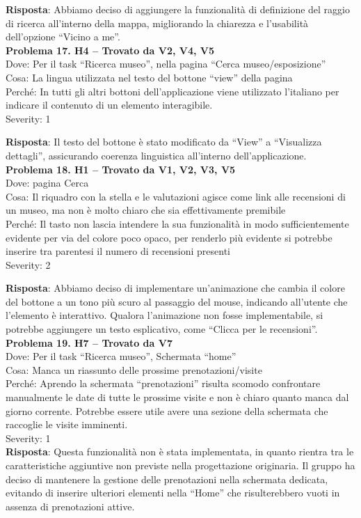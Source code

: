 \documentclass{article}
\begin{document}
\noindent \textbf{Risposta}: Abbiamo deciso di aggiungere la funzionalità di definizione del raggio di ricerca all'interno della mappa, migliorando la chiarezza e l'usabilità dell’opzione “Vicino a me”.\\

\noindent \textbf{Problema 17. H4 – Trovato da V2, V4, V5} \\
Dove: Per il task “Ricerca museo”, nella pagina “Cerca museo/esposizione” \\
Cosa: La lingua utilizzata nel testo del bottone “view” della pagina \\
Perché: In tutti gli altri bottoni dell’applicazione viene utilizzato l’italiano per indicare il contenuto di un elemento interagibile. \\
Severity: 1 

\noindent \textbf{Risposta}: Il testo del bottone è stato modificato da “View” a “Visualizza dettagli”, assicurando coerenza linguistica all’interno dell’applicazione.\\

\noindent \textbf{Problema 18. H1 – Trovato da V1, V2, V3, V5} \\
Dove: pagina Cerca \\
Cosa: Il riquadro con la stella e le valutazioni agisce come link alle recensioni di un museo, ma non è molto chiaro che sia effettivamente premibile \\
Perché: Il tasto non lascia intendere la sua funzionalità in modo sufficientemente evidente per via del colore poco opaco, per renderlo più evidente si potrebbe inserire tra parentesi il numero di recensioni presenti \\
Severity: 2

\noindent \textbf{Risposta}: Abbiamo deciso di implementare un'animazione che cambia il colore del bottone a un tono più scuro al passaggio del mouse, indicando all’utente che l’elemento è interattivo. Qualora l’animazione non fosse implementabile, si potrebbe aggiungere un testo esplicativo, come “Clicca per le recensioni”.\\

\noindent \textbf{Problema 19. H7 – Trovato da V7} \\
Dove: Per il task “Ricerca museo”, Schermata “home” \\
Cosa: Manca un riassunto delle prossime prenotazioni/visite \\
Perché: Aprendo la schermata “prenotazioni” risulta scomodo confrontare manualmente le date di tutte le prossime visite e non è chiaro quanto manca dal giorno corrente. Potrebbe essere utile avere una sezione della schermata che raccoglie le visite imminenti. \\
Severity: 1 \\
\textbf{Risposta}: Questa funzionalità non è stata implementata, in quanto rientra tra le caratteristiche aggiuntive non previste nella progettazione originaria. Il gruppo ha deciso di mantenere la gestione delle prenotazioni nella schermata dedicata, evitando di inserire ulteriori elementi nella “Home” che risulterebbero vuoti in assenza di prenotazioni attive.\\
\end{document}
